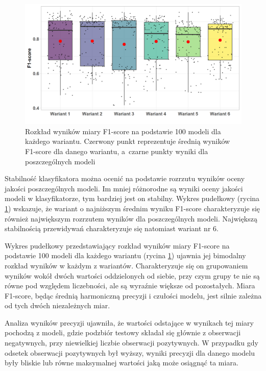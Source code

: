 \documentclass{amuthesis}
\begin{document}
\begin{figure}[t]

{\centering \includegraphics[width=1\textwidth,height=\textheight]{figures/f1_score_boxplot.png}

}

\caption{\label{fig-rycina-f1-score-boxplot}Rozkład wyników miary
F1-score na podstawie 100 modeli dla każdego wariantu. Czerwony punkt
reprezentuje średnią wyników F1-score dla danego wariantu, a~czarne
punkty wyniki dla poszczególnych modeli}

\end{figure}

Stabilność klasyfikatora można ocenić na podstawie rozrzutu wyników
oceny jakości poszczególnych modeli. Im mniej różnorodne są wyniki oceny
jakości modeli w klasyfikatorze, tym bardziej jest on stabilny. Wykres
pudełkowy (rycina \ref{fig-rycina-f1-score-boxplot}) wskazuje, że
wariant o najniższym średnim wyniku F1-score charakteryzuje się również
największym rozrzutem wyników dla poszczególnych modeli. Największą
stabilnością przewidywań charakteryzuje się natomiast wariant nr 6.

Wykres pudełkowy przedstawiający rozkład wyników miary F1-score na
podstawie 100 modeli dla każdego wariantu (rycina
\ref{fig-rycina-f1-score-boxplot}) ujawnia jej bimodalny rozkład wyników
w każdym z wariantów. Charakteryzuje się on grupowaniem wyników wokół
dwóch wartości oddzielonych od siebie, przy czym grupy te nie są równe
pod względem liczebności, ale są wyraźnie większe od pozostałych. Miara
F1-score, będąc średnią harmoniczną precyzji i czułości modelu, jest
silnie zależna od tych dwóch niezależnych miar.

Analiza wyników precyzji ujawniła, że wartości odstające w wynikach tej
miary pochodzą z modeli, gdzie podzbiór testowy składał się głównie z
obserwacji negatywnych, przy niewielkiej liczbie obserwacji pozytywnych.
W przypadku gdy odsetek obserwacji pozytywnych był wyższy, wyniki
precyzji dla danego modelu były bliskie lub równe maksymalnej wartości
jaką może osiągnąć ta miara.
\end{document}
